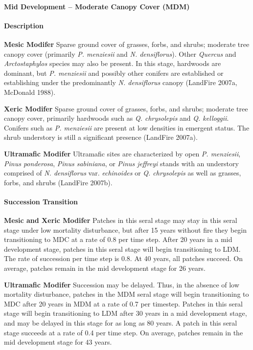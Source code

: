 \paragraph{Mid Development – Moderate Canopy Cover (MDM)}

\paragraph{Description}
\begin{adjustwidth}{2cm}{}
\textbf{Mesic Modifer } Sparse ground cover of grasses, forbs, and shrubs; moderate tree canopy cover (primarily \emph{P. menziesii} and \emph{ N. densiflorus}). Other \emph{Quercus} and \emph{Arctostaphylos} species may also be present. In this stage, hardwoods are dominant, but \emph{P. menziesii} and possibly other conifers are established or establishing under the predominantly \emph{N. densiflorus} canopy (LandFire 2007a, McDonald 1988). 


\medskip
\noindent \textbf{Xeric Modifer} Sparse ground cover of grasses, forbs, and shrubs; moderate tree canopy cover, primarily hardwoods such as \emph{Q. chrysolepis} and \emph{Q. kelloggii}. Conifers such as \emph{P. menziesii} are present at low densities in emergent status. The shrub understory is still a significant presence (LandFire 2007a). 


\medskip
\noindent \textbf{Ultramafic Modifer}  Ultramafic sites are characterized by open \emph{P. menziesii}, \emph{Pinus ponderosa}, \emph{Pinus sabiniana}, or \emph{Pinus jeffreyi} stands with an understory comprised of \emph{N. densiflorus} var. \emph{echinoides} or \emph{Q. chrysolepis} as well as grasses, forbs, and shrubs (LandFire 2007b).

\end{adjustwidth}
\paragraph{Succession Transition}
\begin{adjustwidth}{2cm}{}
\textbf{Mesic and Xeric Modifer } Patches in this seral stage may stay in this seral stage under low mortality disturbance, but after 15 years without fire they begin transitioning to MDC at a rate of 0.8 per time step. After 20 years in a mid development stage, patches in this seral stage will begin transitioning to LDM. The rate of succession per time step is 0.8. At 40 years, all patches succeed. On average, patches remain in the mid development stage for 26 years.


\medskip
\noindent \textbf{Ultramafic Modifer} Succession may be delayed. Thus, in the absence of low mortality disturbance, patches in the MDM seral stage will begin transitioning to MDC after 20 years in MDM at a rate of 0.7 per timestep. Patches in this seral stage will begin transitioning to LDM after 30 years in a mid development stage, and may be delayed in this stage for as long as 80 years. A patch in this seral stage succeeds at a rate of 0.4 per time step. On average, patches remain in the mid development stage for 43 years.

\end{adjustwidth}
